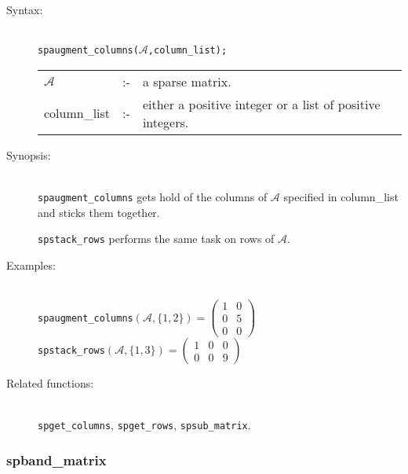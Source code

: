 \begin{description}
\item[Syntax:]\mbox{}\\
 \texttt{spaugment\_columns($\mathcal{A}$,column\_list);}\\[2mm]
\begin{tabular}{l l l}
$\mathcal{A}$  &:-& a sparse matrix. \\
column\_list &:-&  either a positive integer or a list of positive
                   integers.
\end{tabular}

\item[Synopsis:]\mbox{}\\
\texttt{spaugment\_columns} gets hold of the columns of $\mathcal{A}$ specified
in column\_list and sticks them together.

\texttt{spstack\_rows} performs the same task on rows of
                $\mathcal{A}$.

\item[Examples:]\mbox{}\\
\texttt{spaugment\_columns}\((\mathcal{A},\{1,2\})  =
\begin{pmatrix} 1 & 0 \\ 0 & 5 \\ 0 & 0 \end{pmatrix}\)  \\[2mm]
\texttt{spstack\_rows}\((\mathcal{A},\{1,3\})  =
\begin{pmatrix} 1 & 0 & 0 \\ 0 & 0 & 9 \end{pmatrix}\)

\item[Related functions:]\mbox{}\\
\texttt{spget\_columns}, \texttt{spget\_rows},
\texttt{spsub\_matrix}.
\end{description}

\subsubsection{spband\_matrix}
\label{sparse:spband_matrix}
\hypertarget{operator:SPBAND_MATRIX}{}

